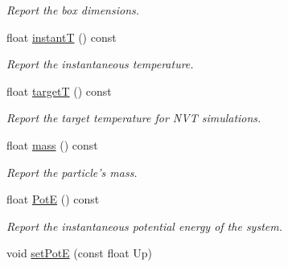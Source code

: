 \begin{DoxyCompactItemize}
\begin{DoxyCompactList}\small\item\em Report the box dimensions. \end{DoxyCompactList}\item 
\hypertarget{classsystem_definition_af7b322cfc8abe7042fdbeb0af8e7aa7e}{float \hyperlink{classsystem_definition_af7b322cfc8abe7042fdbeb0af8e7aa7e}{instant\-T} () const }\label{classsystem_definition_af7b322cfc8abe7042fdbeb0af8e7aa7e}

\begin{DoxyCompactList}\small\item\em Report the instantaneous temperature. \end{DoxyCompactList}\item 
\hypertarget{classsystem_definition_a3c958df2ab99c0cb75c740346a5a4b6f}{float \hyperlink{classsystem_definition_a3c958df2ab99c0cb75c740346a5a4b6f}{target\-T} () const }\label{classsystem_definition_a3c958df2ab99c0cb75c740346a5a4b6f}

\begin{DoxyCompactList}\small\item\em Report the target temperature for N\-V\-T simulations. \end{DoxyCompactList}\item 
\hypertarget{classsystem_definition_acb6dd3df121e3e5bc0eb41c32bd937bd}{float \hyperlink{classsystem_definition_acb6dd3df121e3e5bc0eb41c32bd937bd}{mass} () const }\label{classsystem_definition_acb6dd3df121e3e5bc0eb41c32bd937bd}

\begin{DoxyCompactList}\small\item\em Report the particle's mass. \end{DoxyCompactList}\item 
\hypertarget{classsystem_definition_a0b2c9729ed74a21dc91cab199e0fd99c}{float \hyperlink{classsystem_definition_a0b2c9729ed74a21dc91cab199e0fd99c}{Pot\-E} () const }\label{classsystem_definition_a0b2c9729ed74a21dc91cab199e0fd99c}

\begin{DoxyCompactList}\small\item\em Report the instantaneous potential energy of the system. \end{DoxyCompactList}\item 
\hypertarget{classsystem_definition_a92a7d6457bd3f7ce71088e4df8e9ff4b}{void \hyperlink{classsystem_definition_a92a7d6457bd3f7ce71088e4df8e9ff4b}{set\-Pot\-E} (const float Up)}\label{classsystem_definition_a92a7d6457bd3f7ce71088e4df8e9ff4b}


\end{DoxyCompactItemize}
